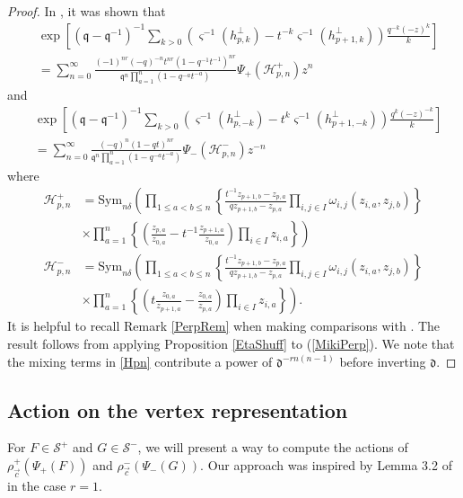 \documentclass{amsart}
\newcommand{\qqq}{\mathfrak{q}}
\newcommand{\ddd}{\mathfrak{d}}
\theoremstyle{remark}
\numberwithin{thm}{section}
\numberwithin{equation}{section}
\begin{document}
\begin{proof}
In \cite{Wen}, it was shown that
\begin{align*}
&\exp\left[(\qqq-\qqq^{-1})^{-1}\sum_{k>0}\left(\varsigma^{-1}(h_{p, k}^\perp)-t^{-k}\varsigma^{-1}(h_{p+1, k}^\perp)\right)\frac{q^{-k} (-z)^{ k}}{k} \right]\\
&= \sum_{n=0}^\infty\frac{(-1)^{nr}(-q)^{-n}t^{nr}(1-q^{-1}t^{-1})^{nr}}{\qqq^n\prod_{a=1}^n(1-q^{-a}t^{-a})}\Psi_+(\mathcal{H}_{p,n}^+)z^n
\end{align*}
and
\begin{align*}
&\exp\left[(\qqq-\qqq^{-1})^{-1}\sum_{k>0}\left(\varsigma^{-1}(h_{p,- k}^\perp)-t^{ k}\varsigma^{-1}(h_{p+1,- k}^\perp)\right)\frac{q^{ k} (-z)^{- k}}{k} \right]\\
&= \sum_{n=0}^\infty\frac{(-q)^n(1-qt)^{nr}}{\qqq^n\prod_{a=1}^n(1-q^{-a}t^{-a})}\Psi_-(\mathcal{H}_{p,n}^-)z^{-n}
\end{align*}
where
\begin{equation}
\begin{aligned}
\mathcal{H}^+_{p,n}&= \mathrm{Sym}_{n\delta}\left( \prod_{1\le a<b\le n}\left\{\frac{t^{-1}z_{p+1,b}-z_{p,a}}{qz_{p+1,b}-z_{p,a}}\prod_{i,j\in I}\omega_{i,j}\left( z_{i,a},z_{j,b} \right)\right\}\right.\\
&\times \left.\prod_{a=1}^n\left\{\left( \frac{z_{p,a}}{z_{0,a}}-t^{-1}\frac{z_{p+1,a}}{z_{0,a}} \right)\prod_{i\in I}z_{i,a}  \right\} \right)\\
\mathcal{H}^-_{p,n}&= \mathrm{Sym}_{n\delta}\left( \prod_{1\le a<b\le n}\left\{\frac{t^{-1}z_{p+1,b}-z_{p,a}}{qz_{p+1,b}-z_{p,a}}\prod_{i,j\in I}\omega_{i,j}\left( z_{i,a},z_{j,b} \right)\right\}\right.\\
&\times \left.\prod_{a=1}^n\left\{\left( t\frac{z_{0,a}}{z_{p+1,a}}-\frac{z_{0,a}}{z_{p,a}} \right)\prod_{i\in I}z_{i,a}  \right\} \right).
\end{aligned}
\label{Hpn}
\end{equation}
It is helpful to recall Remark \ref{PerpRem} when making comparisons with \cite{Wen}.
The result follows from applying Proposition \ref{EtaShuff} to (\ref{MikiPerp}).
We note that the mixing terms in \ref{Hpn} contribute a power of $\ddd^{-r n(n-1)}$ before inverting $\ddd$.
\end{proof}

\subsection{Action on the vertex representation}
For $F\in\mathcal{S}^+$ and $G\in\mathcal{S}^-$, we will present a way to compute the actions of $\rho^+_{\vec{c}}(\Psi_+(F))$ and $\rho_{\vec{c}}^-(\Psi_-(G))$.
Our approach was inspired by Lemma 3.2 of \cite{FJM} in the case $r=1$.
\end{document}
